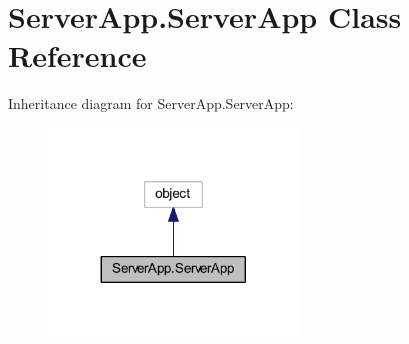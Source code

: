 \hypertarget{class_server_app_1_1_server_app}{}\section{Server\+App.\+Server\+App Class Reference}
\label{class_server_app_1_1_server_app}


Inheritance diagram for Server\+App.\+Server\+App\+:\nopagebreak
\begin{figure}[H]
\begin{center}
\leavevmode
\includegraphics[width=188pt]{class_server_app_1_1_server_app__inherit__graph}
\end{center}
\end{figure}
